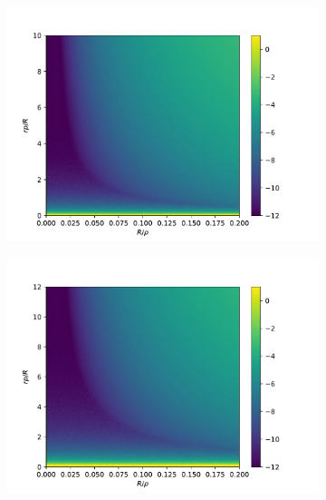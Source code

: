 \begin{figure}[!htb]
\begin{subfigure}{.33\textwidth}
    \caption{\label{fig:extrap-err-p8}}
  \end{subfigure}%
    \begin{subfigure}{.33\textwidth}
      \centering
      \includegraphics[width=\linewidth]{figs/extrapolation_error_plot_p10.pdf}
    \caption{\label{fig:extrap-err-p10}}
  \end{subfigure}
  \begin{subfigure}{.33\textwidth}
      \centering
      \includegraphics[width=\linewidth]{figs/extrapolation_error_plot_p12.pdf}
    \caption{\label{fig:extrap-err-p12}}
  \end{subfigure}%
  \begin{subfigure}{.33\textwidth}
      \centering

\end{subfigure}
\end{figure}
